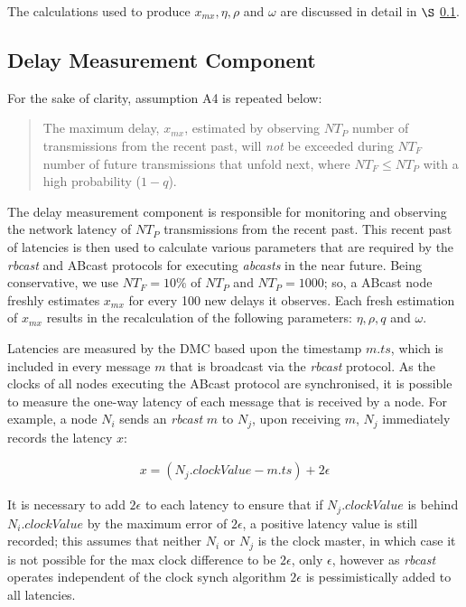     The calculations used to produce $x_{mx}, \eta, \rho$ and $\omega$ are discussed in detail in $\S$ \ref{ssec:dmc}.  
    
    \subsection{Delay Measurement Component}\label{ssec:dmc}
        For the sake of clarity, assumption A4 is repeated below:   
        
        \begin{quotation}
            The maximum delay, $x_{mx}$, estimated by observing $NT_P$ number of transmissions from the recent past, will \emph{not} be exceeded during $NT_F$ number of future transmissions that unfold next, where $NT_F \leq NT_P$ with a high probability ($1 - q$).
        \end{quotation}
    
        The delay measurement component is responsible for monitoring and observing the network latency of $NT_P$ transmissions from the recent past.  This recent past of latencies is then used to calculate various parameters that are required by the \emph{rbcast} and \textsf{ABcast} protocols for executing \emph{abcasts} in the near future.  Being conservative, we use $NT_F = 10\%$ of $NT_P$ and $NT_P=1000$; so, a \textsf{ABcast} node freshly estimates $x_{mx}$ for every 100 new delays it observes.  Each fresh estimation of $x_{mx}$ results in the recalculation of the following parameters: $\eta, \rho, q$ and $\omega$.  
        
        Latencies are measured by the DMC based upon the timestamp $m.ts$, which is included in every message $m$ that is broadcast via the \emph{rbcast} protocol.  As the clocks of all nodes executing the \textsf{ABcast} protocol are synchronised, it is possible to measure the one-way latency of each message that is received by a node.  For example, a node $N_i$ sends an \emph{rbcast} $m$ to $N_j$, upon receiving $m$, $N_j$ immediately records the latency $x$:

        \begin{equation*}
             \begin{aligned}
                 x = (N_j.clockValue - m.ts) + 2\epsilon
             \end{aligned}
        \end{equation*}        
        
        It is necessary to add $2\epsilon$ to each latency to ensure that if $N_j.clockValue$ is behind $N_i.clockValue$ by the maximum error of $2\epsilon$, a positive latency value is still recorded; this assumes that neither $N_i$ or $N_j$ is the clock master, in which case it is not possible for the max clock difference to be $2\epsilon$, only $\epsilon$, however as \emph{rbcast} operates independent of the clock synch algorithm $2\epsilon$ is pessimistically added to all latencies.  
                                
